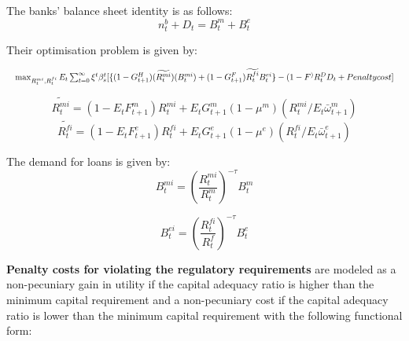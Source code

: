 \documentclass[12pt]{article}
\numberwithin{equation}{section}
\begin{document}
The banks' balance sheet identity is as follows:
\begin{equation}
n^b_{t}+D_{t}=B^m_{t}+B^e_{t}
\end{equation}



Their optimisation problem is given by:

\begin{equation}
\resizebox{1\textwidth}{!}{$
	\max_{R^{mi}_t,R^{fi}_t}E_t\sum _{t=0}^{\infty }\xi^t\beta_{s}^t [\{(1-G^H_{t+1}) (\widetilde{R^{mi}_{t}})(B^{mi}_{t})+(1-G^F_{t+1})\widetilde{R^{fi}_{t}}B^{ei}_{t}\}-(1-F^){R^D_{t}}D_{t}+Penalty cost]$}
\end{equation}



\begin{equation}
\widetilde{R^{mi}_{t}}=(1-E_tF^m_{t+1})R^{mi}_t+E_tG^m_{t+1}(1 - \mu^m)( R^{mi}_t/E_t\bar{\omega}^m_{t+1})
\end{equation}
\begin{equation}
\widetilde{R^{fi}_{t}}=(1-E_tF^e_{t+1})R^{fi}_t+E_tG^e_{t+1}(1 - \mu^e)( R^{fi}_t/E_t\bar{\omega}^e_{t+1})
\end{equation}

The demand for loans is given by:
\begin{equation}
B^{mi}_t=(\frac{R^{mi}_t}{R^{m}_t})^{-\tau} B^{m}_t
\end{equation}

\begin{equation}
B^{ei}_t=(\frac{R^{fi}_t}{R^{f}_t})^{-\tau} B^{e}_t
\end{equation}




\textbf{Penalty costs for violating the regulatory requirements}  are modeled as a non-pecuniary gain in utility if the capital adequacy ratio is higher than the minimum capital requirement and a non-pecuniary cost if the capital adequacy ratio is lower than the minimum capital requirement with the following functional form: 
\end{document}
